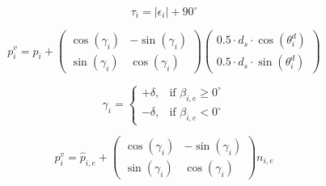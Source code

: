 \documentclass[conference]{IEEEtran}
\begin{document}
\begin{equation}
\tau_i = | \epsilon_i | + 90^\circ
\label{eq:32}
\end{equation}

\begin{equation}
p^v_i = p_i +
\begin{pmatrix}
\cos(\gamma_i) & -\sin(\gamma_i) \\
\sin(\gamma_i) & \cos(\gamma_i)
\end{pmatrix}
\begin{pmatrix}
0.5 \cdot d_s \cdot \cos(\theta^d_i) \\
0.5 \cdot d_s \cdot \sin(\theta^d_i)
\end{pmatrix}
\label{eq:33}
\end{equation}

\begin{equation}
\gamma_i =
\begin{cases}
+\delta, & \text{if } \beta_{i,e} \geq 0^\circ \\
-\delta, & \text{if } \beta_{i,e} < 0^\circ
\end{cases}
\label{eq:34}
\end{equation}

\begin{equation}
p^v_i = \hat{p}_{i,e} +
\begin{pmatrix}
\cos(\gamma_i) & -\sin(\gamma_i) \\
\sin(\gamma_i) & \cos(\gamma_i)
\end{pmatrix}
n_{i,e}
\label{eq:35}
\end{equation}
\end{document}
